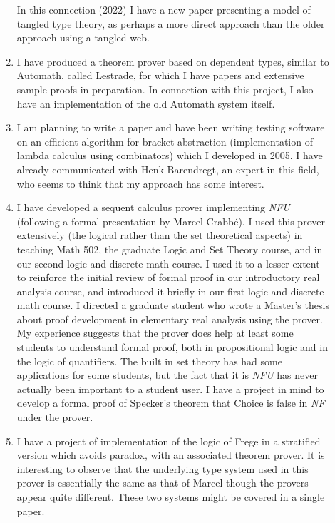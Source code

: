 \begin{description}
\begin{enumerate}
In this connection (2022) I have a new paper presenting a model of tangled type theory, as perhaps a more direct approach than the older approach using a tangled web.

\item  I have produced a theorem prover based on dependent types, similar to Automath, called Lestrade,
for which I have papers and extensive sample proofs in preparation.  In connection with this project, I also
have an implementation of the old Automath system itself.

\item I am planning to write a paper and have been writing testing
software on an efficient algorithm for bracket abstraction
(implementation of lambda calculus using combinators) which I
developed in 2005.  I have already communicated with Henk Barendregt,
an expert in this field, who seems to think that my approach has some
interest.

\item I have developed a sequent calculus prover implementing {\em
NFU\/} (following a formal presentation by Marcel Crabb\'e).  I used
this prover extensively (the logical rather than the set theoretical
aspects) in teaching Math 502, the graduate Logic and Set Theory
course, and in our second logic and discrete math course.  I used it
to a lesser extent to reinforce the initial review of formal proof in
our introductory real analysis course, and introduced it briefly in
our first logic and discrete math course.  I directed a graduate
student who wrote a Master's thesis about proof development in
elementary real analysis using the prover.   My
experience suggests that the prover does help at least some students to understand
formal proof, both in propositional logic and in the logic of
quantifiers.  The built in set theory has had some applications for
some students, but the fact that it is {\em NFU\/} has never actually
been important to a student user.  I have a project in mind to develop
a formal proof of Specker's theorem that Choice is false in {\em NF\/}
under the prover.

\item I have a project of implementation of the logic of Frege in a stratified version which avoids paradox,
with an associated theorem prover.  It is interesting to observe that the underlying type system used in this prover is essentially the same as that of Marcel though the provers appear quite different.  These two systems might be covered in a single paper.


\end{enumerate}
\end{description}
